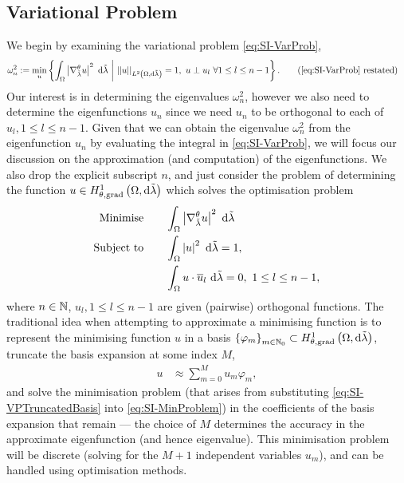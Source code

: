 \subsection{Variational Problem} \label{ssec:SI-VP}
We begin by examining the variational problem \eqref{eq:SI-VarProb},
\begin{align*} 
	\omega_n^2 &:= \min_{u}\clbracs{ \integral{\ddom}{ \abs{\tgrad_{\compMes}u}^2 }{\compMes} \setVert \norm{u}_{\ltwo{\ddom}{\compMes}}=1, \ u\perp u_l \ \forall 1\leq l\leq n-1 }. \tag{\eqref{eq:SI-VarProb} restated}
\end{align*}
Our interest is in determining the eigenvalues $\omega_n^2$, however we also need to determine the eigenfunctions $u_n$ since we need $u_n$ to be orthogonal to each of $u_l, 1\leq l\leq n-1$.
Given that we can obtain the eigenvalue $\omega_n^2$ from the eigenfunction $u_n$ by evaluating the integral in \eqref{eq:SI-VarProb}, we will focus our discussion on the approximation (and computation) of the eigenfunctions.
We also drop the explicit subscript $n$, and just consider the problem of determining the function $u\in H^1_{\theta, \mathrm{grad}}\left( \Omega, \mathrm{d}\tilde{\lambda} \right)$ which solves the optimisation problem
\begin{subequations} \label{eq:SI-MinProblem}
	\begin{align}
		\text{Minimise} \quad & \quad \int_{\Omega} \left\lvert \nabla^{\theta}_{\tilde{\lambda}}u \right\rvert^2  \ \mathrm{d}\tilde{\lambda} \\
		\text{Subject to} \quad & \quad \int_{\Omega} \left\lvert u \right\rvert^2  \ \mathrm{d}\tilde{\lambda} = 1, \\
		& \quad \int_{\Omega} u\cdot\overline{u}_l  \ \mathrm{d}\tilde{\lambda} = 0, \ 1\leq l\leq n-1,
	\end{align}
\end{subequations}
where $n\in\mathbb{N}$, $u_l, 1\leq l\leq n-1$ are given (pairwise) orthogonal functions.
The traditional idea when attempting to approximate a minimising function is to represent the minimising function $u$ in a basis $\left\{ \varphi_m \right\}_{m\in\mathbb{N}_0}\subset H^1_{\theta, \mathrm{grad}}\left( \Omega, \mathrm{d}\tilde{\lambda} \right)$, truncate the basis expansion at some index $M$,
\begin{align} \label{eq:SI-VPTruncatedBasis}
	u &\approx \sum_{m=0}^M u_m \varphi_m,
\end{align}
and solve the minimisation problem (that arises from substituting \eqref{eq:SI-VPTruncatedBasis} into \eqref{eq:SI-MinProblem}) in the coefficients of the basis expansion that remain --- the choice of $M$ determines the accuracy in the approximate eigenfunction (and hence eigenvalue).
This minimisation problem will be discrete (solving for the $M+1$ independent variables $u_m$), and can be handled using optimisation methods.

